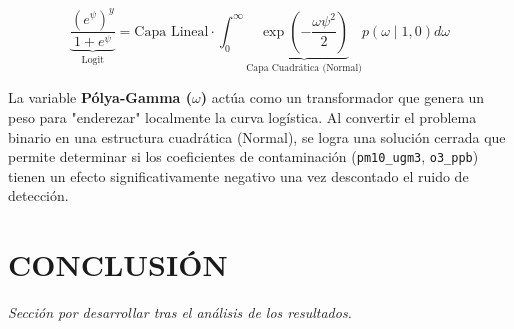 \documentclass[twocolumn,10pt]{article}
\begin{document}
\begin{equation}
  \underbrace{\dfrac{(e^\psi)^y}{1+e^\psi}}_{\text{Logit}} = \text{Capa Lineal} \cdot \int_0^\infty \underbrace{\exp \left( -\frac{\omega \psi^2}{2} \right)}_{\text{Capa Cuadrática (Normal)}} p(\omega \mid 1, 0) d\omega
\end{equation}

La variable \textbf{Pólya-Gamma ($\omega$)} actúa como un transformador que genera un peso para "enderezar" localmente la curva logística. Al convertir el problema binario en una estructura cuadrática (Normal), se logra una solución cerrada que permite determinar si los coeficientes de contaminación (\texttt{pm10\_ugm3}, \texttt{o3\_ppb}) tienen un efecto significativamente negativo una vez descontado el ruido de detección.


\section{CONCLUSIÓN}

\justifying
\textit{Sección por desarrollar tras el análisis de los resultados.}




\end{document}
